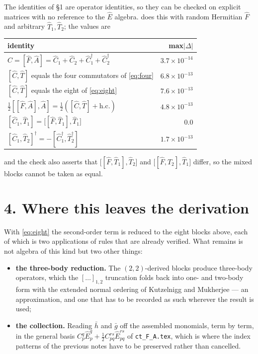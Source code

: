 \documentclass[11pt]{article}
\newcommand{\E}[2]{\hat E^{#1}_{#2}}
\newcommand{\hc}{\mathrm{h.c.}}
\begin{document}
The identities of \S1 are operator identities, so they can be checked on
explicit matrices with no reference to the $\hat E$ algebra.
 does this with random Hermitian $\hat F$ and
arbitrary $\hat T_1,\hat T_2$; the values are
\begin{center}
\footnotesize
\begin{tabular}{@{}lr@{}}
\toprule
identity & max$|\Delta|$ \\
\midrule
$\hat C=[\hat F,\hat A]=\hat C_1+\hat C_2+\hat C_1^\dagger+\hat C_2^\dagger$
  & $3.7\times10^{-14}$ \\
$[\hat C,\hat T]$ equals the four commutators of \eqref{eq:four}
  & $6.8\times10^{-13}$ \\
$[\hat C,\hat T]$ equals the eight of \eqref{eq:eight}
  & $7.6\times10^{-13}$ \\
$\tfrac12[[\hat F,\hat A],\hat A]=\tfrac12([\hat C,\hat T]+\hc)$
  & $4.8\times10^{-13}$ \\
$[\hat C_1,\hat T_1]=\bigl[[\hat F,\hat T_1],\hat T_1\bigr]$
  & $0.0$ \\
$[\hat C_1,\hat T_2]^\dagger=-[\hat C_1^\dagger,\hat T_2^\dagger]$
  & $1.7\times10^{-13}$ \\
\bottomrule
\end{tabular}
\end{center}
and the check also asserts that
$\bigl[[\hat F,\hat T_1],\hat T_2\bigr]$ and
$\bigl[[\hat F,\hat T_2],\hat T_1\bigr]$ differ, so the mixed blocks cannot be
taken as equal.

\section*{4. Where this leaves the derivation}

With \eqref{eq:eight} the second-order term is reduced to the eight blocks
above, each of which is two applications of rules that are already verified.
What remains is not algebra of this kind but two other things:
\begin{itemize}
  \item \textbf{the three-body reduction.} The $(2,2)$-derived blocks produce
        three-body operators, which the $[\dots]_{1,2}$ truncation folds back
        into one- and two-body form with the extended normal ordering of
        Kutzelnigg and Mukherjee --- an approximation, and one that has to be
        recorded as such wherever the result is used;
  \item \textbf{the collection.} Reading $\bar h$ and $\bar g$ off the
        assembled monomials, term by term, in the general basis
        $C^q_p\E{q}{p}+\tfrac12C^{rs}_{pq}\E{rs}{pq}$ of \texttt{ct\_F\_A.tex},
        which is where the index patterns of the previous notes have to be
        preserved rather than cancelled.
\end{itemize}
\end{document}
